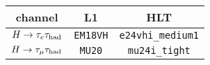 \begin{tabular}{c|c|c}
  channel      & L1              & HLT                      \\
  \hline
  $H\rightarrow\tau_e \tau_\text{had}$ & \texttt{EM18VH} & \texttt{e24vhi\_medium1} \\
  $H\rightarrow\tau_\mu \tau_\text{had}$ & \texttt{MU20}   & \texttt{mu24i\_tight}    \\
\end{tabular}

